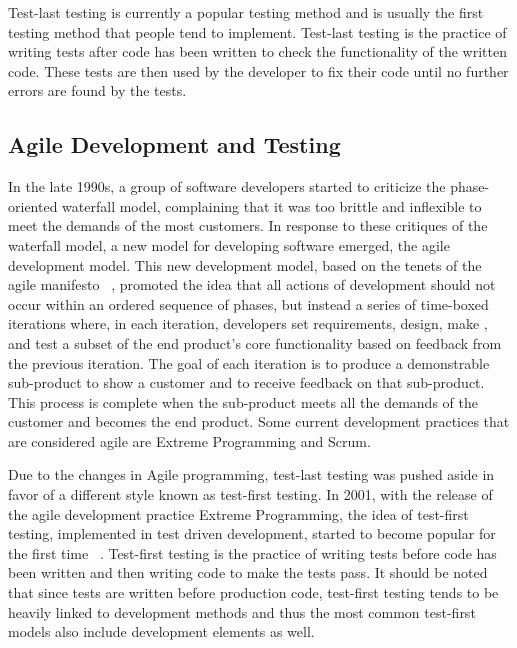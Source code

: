\documentclass{sig-alternate}
\begin{document}
Test-last testing is currently a popular testing method and is usually the first testing method that people tend to implement.  Test-last testing is the practice of writing tests after code has been written to check the functionality of the written code.  These tests are then used by the developer to fix their code until no further errors are found by the tests.

\subsection{Agile Development and Testing}

In the late 1990s, a group of software developers started to criticize the phase-oriented waterfall model, complaining that it was too brittle and inflexible to meet the demands of the most customers.  In response to these critiques of the waterfall model, a new model for developing software emerged, the agile development model.  This new development model, based on the tenets of the agile manifesto ~\cite{agile:xxx}, promoted the idea that all actions of development should not occur within an ordered sequence of phases, but instead a series of time-boxed iterations where, in each iteration, developers set requirements, design, make , and test a subset of the end product's core functionality based on feedback from the previous iteration.  The goal of each iteration is to produce a demonstrable sub-product to show a customer and to receive feedback on that sub-product.  This process is complete when the sub-product meets all the demands of the customer and becomes the end product.  Some current development practices that are considered agile are Extreme Programming and Scrum.

Due to the changes in Agile programming, test-last testing was pushed aside in favor of a different style known as test-first testing.  In 2001, with the release of the agile development practice Extreme Programming, the idea of test-first testing, implemented in test driven development, started to become popular for the first time ~\cite{Hammond:2012}. Test-first testing is the practice of writing tests before code has been written and then writing code to make the tests pass.  It should be noted that since tests are written before production code, test-first testing tends to be heavily linked to development methods and thus the most common test-first models also include development elements as well. 
\end{document}
